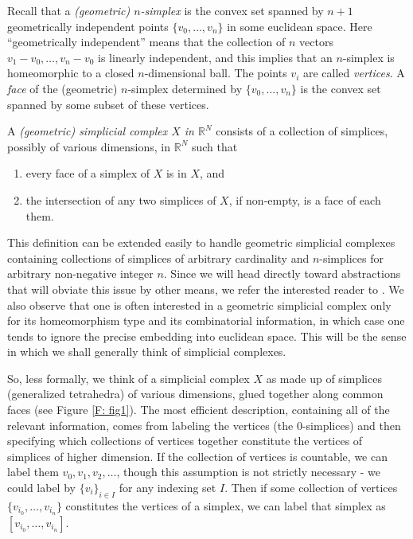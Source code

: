 \documentclass[12pt]{article}
\theoremstyle{plain}
\theoremstyle{definition}
\newcommand{\R}{\mathbb{R}}
\begin{document}
Recall that a \emph{(geometric) $n$-simplex} is the convex set spanned by $n+1$ geometrically independent points $\{v_0,\ldots, v_n\}$ in some euclidean space. Here ``geometrically independent'' means that the collection of $n$ vectors $v_1-v_0,\ldots, v_n-v_0$ is linearly independent, and this implies that an $n$-simplex is homeomorphic to a closed $n$-dimensional ball. The points $v_i$ are called \emph{vertices}. A \emph{face} of the (geometric) $n$-simplex determined by $\{v_0,\ldots, v_n\}$ is the convex set spanned by some subset of these vertices. 

A \emph{(geometric) simplicial complex $X$ in $\R^N$} consists of a collection of simplices, possibly of various dimensions, in $\R^N$ such that \begin{enumerate}
\item every face of a simplex of $X$ is in $X$, and
\item the intersection of any two simplices of $X$, if non-empty, is a face of each them.
\end{enumerate}
This definition can be extended easily to handle geometric simplicial complexes containing collections of simplices of arbitrary cardinality and $n$-simplices for arbitrary non-negative integer $n$. Since we will head directly toward abstractions that will obviate this issue by other means, we refer the interested reader to \cite[Section 2]{MK}. We also observe that one is often interested in a geometric simplicial complex only for its homeomorphism type and its combinatorial information, in which case one tends to ignore the precise embedding into euclidean space. This will be the sense in which we shall generally think of simplicial complexes. 



So, less formally, we think of a simplicial complex $X$ as made up of simplices (generalized tetrahedra) of various dimensions, glued together along common faces (see Figure \ref{F: fig1}). The most efficient description, containing all of the relevant information, comes from labeling the vertices (the $0$-simplices) and then specifying which collections of vertices together constitute the vertices of simplices of higher dimension. 
If  the collection of vertices is countable,  we can label them $v_0, v_1,v_2,\ldots$, though this assumption is not strictly necessary - we could label by $\{v_i\}_{i\in I}$ for any indexing set $I$. Then if some collection of vertices $\{v_{i_0},\ldots, v_{i_n}\}$ constitutes the vertices of a simplex, we can label that simplex as $[v_{i_0},\ldots, v_{i_n}]$. 
\end{document}

